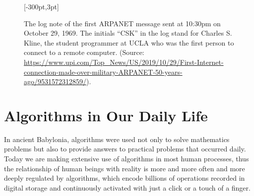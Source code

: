 {{{\begin{figure}[t!]
[-300pt,3pt]
\caption{\label{fig:1.5}The log note of the first ARPANET message sent at 10:30pm on October 29, 1969. The initials ``CSK'' in the log stand for Charles S. Kline, the student programmer at UCLA who was the first person to connect to a remote computer. (Source: \href{https://www.upi.com/Top\_News/US/2019/10/29/First-Internet-connection-made-over-military-ARPANET-50-years-ago/9531572312859/}{https://{\allowbreak}www.{\allowbreak}upi.{\allowbreak}com/{\allowbreak}Top{\allowbreak}\_{\allowbreak}News/{\allowbreak}US/{\allowbreak}2019/{\allowbreak}10/{\allowbreak}29/{\allowbreak}First-{\allowbreak}Internet-{\allowbreak}connection-{\allowbreak}made-{\allowbreak}over-{\allowbreak}military-{\allowbreak}ARPANET-{\allowbreak}50-{\allowbreak}years-{\allowbreak}ago/{\allowbreak}9531572312859/}).}
\end{figure}



\section{\label{sec:1.9}Algorithms in Our Daily Life}

In ancient Babylonia, algorithms were used not only to solve mathematics problems but also to provide answers to practical problems that occurred daily. Today we are making extensive use of algorithms in most human processes, thus the relationship of human beings with reality is more and more often and more deeply regulated by algorithms, which encode billions of operations recorded in digital storage and continuously activated with just a click or a touch of a finger.


}}}
